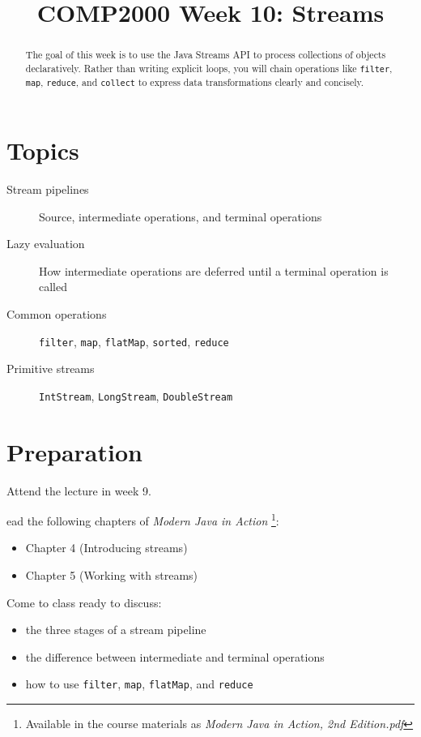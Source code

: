 \documentclass[twoside=false,DIV=14]{scrartcl}
\title{\color{redish} \vspace{-1em}COMP2000 Week 10: Streams}
\begin{document}
{\color{blackish}\maketitle}\vspace{-7em}

\begin{abstract}
The goal of this week is to use the Java Streams API to process collections of objects declaratively.  Rather than writing explicit loops, you will chain operations like \texttt{filter}, \texttt{map}, \texttt{reduce}, and \texttt{collect} to express data transformations clearly and concisely.
\end{abstract}

\section*{Topics}
\begin{description}
\item[Stream pipelines] Source, intermediate operations, and terminal operations
\item[Lazy evaluation] How intermediate operations are deferred until a terminal operation is called
\item[Common operations] \texttt{filter}, \texttt{map}, \texttt{flatMap}, \texttt{sorted}, \texttt{reduce}
\item[Primitive streams] \texttt{IntStream}, \texttt{LongStream}, \texttt{DoubleStream}
\end{description}

\section*{Preparation}
Attend the lecture in week 9.\par
ead the following chapters of \textit{Modern Java in Action}
\footnote{Available in the course materials as \textit{Modern Java in Action, 2nd Edition.pdf}}:
\begin{itemize}
    \item Chapter 4 (Introducing streams)
    \item Chapter 5 (Working with streams)
\end{itemize}

Come to class ready to discuss:
\begin{itemize}
    \item the three stages of a stream pipeline
    \item the difference between intermediate and terminal operations
    \item how to use \texttt{filter}, \texttt{map}, \texttt{flatMap}, and \texttt{reduce}
\end{itemize}
\end{document}
